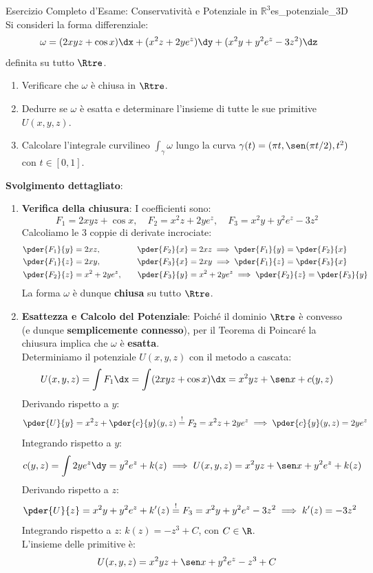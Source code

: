 \begin{esempio}{Esercizio Completo d'Esame: Conservativit\`a e Potenziale in $\mathbb{R}^3$}{es_potenziale_3D}
Si consideri la forma differenziale:
\[
\omega = (2x y z + \cos x) \dx + (x^2 z + 2y e^z) \dy + (x^2 y + y^2 e^z - 3z^2) \dz
\]
definita su tutto $\Rtre$.
\begin{enumerate}
    \item Verificare che $\omega$ è chiusa in $\Rtre$.
    \item Dedurre se $\omega$ è esatta e determinare l'insieme di tutte le sue primitive $U(x,y,z)$.
    \item Calcolare l'integrale curvilineo $\int_\gamma \omega$ lungo la curva $\gamma(t) = (\pi t, \sen(\pi t/2), t^2)$ con $t \in [0, 1]$.
\end{enumerate}

\textbf{Svolgimento dettagliato}:
\begin{enumerate}
    \item \textbf{Verifica della chiusura}: I coefficienti sono:
    \[
    F_1 = 2xyz + \cos x, \quad F_2 = x^2 z + 2y e^z, \quad F_3 = x^2 y + y^2 e^z - 3z^2
    \]
    Calcoliamo le 3 coppie di derivate incrociate:
    \begin{align*}
    \pder{F_1}{y} &= 2xz, \quad &\pder{F_2}{x} &= 2xz \implies \pder{F_1}{y} = \pder{F_2}{x} \\
    \pder{F_1}{z} &= 2xy, \quad &\pder{F_3}{x} &= 2xy \implies \pder{F_1}{z} = \pder{F_3}{x} \\
    \pder{F_2}{z} &= x^2 + 2ye^z, \quad &\pder{F_3}{y} &= x^2 + 2ye^z \implies \pder{F_2}{z} = \pder{F_3}{y}
    \end{align*}
    La forma $\omega$ è dunque \textbf{chiusa} su tutto $\Rtre$.

    \item \textbf{Esattezza e Calcolo del Potenziale}: Poiché il dominio $\Rtre$ è convesso (e dunque \textbf{semplicemente connesso}), per il Teorema di Poincaré la chiusura implica che $\omega$ è \textbf{esatta}.\\
    Determiniamo il potenziale $U(x,y,z)$ con il metodo a cascata:
    \[
    U(x,y,z) = \int F_1 \dx = \int (2xyz + \cos x) \dx = x^2 y z + \sen x + c(y,z)
    \]
    Derivando rispetto a $y$:
    \[
    \pder{U}{y} = x^2 z + \pder{c}{y}(y,z) \stackrel{!}{=} F_2 = x^2 z + 2y e^z \implies \pder{c}{y}(y,z) = 2y e^z
    \]
    Integrando rispetto a $y$:
    \[
    c(y,z) = \int 2y e^z \dy = y^2 e^z + k(z) \implies U(x,y,z) = x^2 y z + \sen x + y^2 e^z + k(z)
    \]
    Derivando rispetto a $z$:
    \[
    \pder{U}{z} = x^2 y + y^2 e^z + k'(z) \stackrel{!}{=} F_3 = x^2 y + y^2 e^z - 3z^2 \implies k'(z) = -3z^2
    \]
    Integrando rispetto a $z$: $k(z) = -z^3 + C$, con $C \in \R$.\\
    L'insieme delle primitive è:
    \[
    U(x,y,z) = x^2 y z + \sen x + y^2 e^z - z^3 + C
    \]


\end{enumerate}
\end{esempio}
